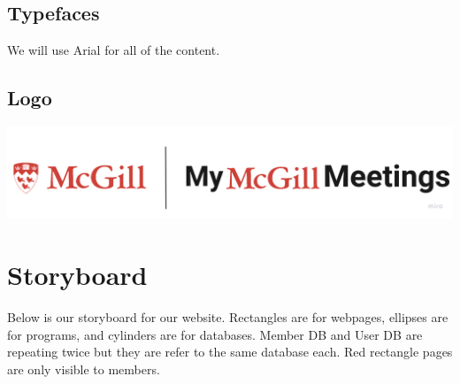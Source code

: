 \documentclass[a4paper,12pt]{article}
\begin{document}
\subsection*{Typefaces}
We will use Arial for all of the content.
\subsection*{Logo}
\includegraphics[scale=0.1]{Logo.png}
\newpage
\section*{Storyboard}
Below is our storyboard for our website. Rectangles are for webpages, ellipses are for programs, and cylinders are for databases. Member DB and User DB are repeating twice but they are refer to the same database each. Red rectangle pages are only visible to members.
\end{document}
